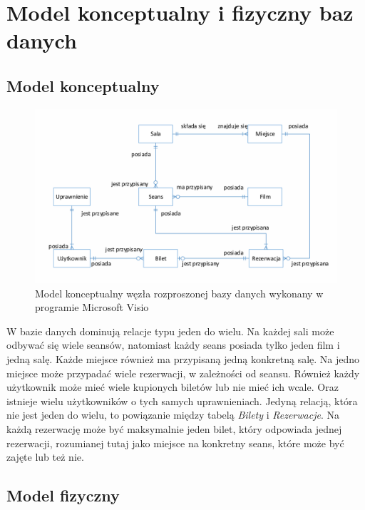 \chapter{Model konceptualny i fizyczny baz danych}

\section{Model konceptualny}

\begin{figure} [H]
	\centering
	\includegraphics[width=1\linewidth]{rozdzial03/model_konceptualny.png}
	\caption{Model konceptualny węzła rozproszonej bazy danych wykonany w programie Microsoft Visio}
	\label{fig:model_koncepcyjny}
\end{figure}

W bazie danych dominują relacje typu jeden do wielu. Na każdej sali może odbywać się wiele seansów, natomiast każdy seans posiada tylko jeden film i jedną salę. Każde miejsce również ma przypisaną jedną konkretną salę. Na jedno miejsce może przypadać wiele rezerwacji, w zależności od seansu. Również każdy użytkownik może mieć wiele kupionych biletów lub nie mieć ich wcale. Oraz istnieje wielu użytkowników o tych samych uprawnieniach. Jedyną relacją, która nie jest jeden do wielu, to powiązanie między tabelą \textit{Bilety} i \textit{Rezerwacje}. Na każdą rezerwację może być maksymalnie jeden bilet, który odpowiada jednej rezerwacji, rozumianej tutaj jako miejsce na konkretny seans, które może być zajęte lub też nie.


\section{Model fizyczny}

